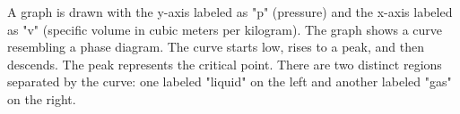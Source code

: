 A graph is drawn with the y-axis labeled as "p" (pressure) and the x-axis labeled as "v" (specific volume in cubic meters per kilogram). The graph shows a curve resembling a phase diagram. The curve starts low, rises to a peak, and then descends. The peak represents the critical point. There are two distinct regions separated by the curve: one labeled "liquid" on the left and another labeled "gas" on the right.